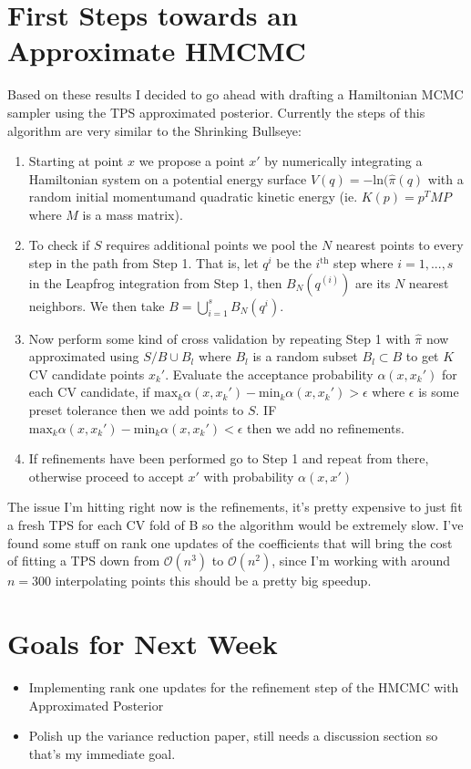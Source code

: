\documentclass[12pt,a4paper]{article}
\begin{document}
\section{First Steps towards an Approximate HMCMC}
Based on these results I decided to go ahead with drafting a Hamiltonian MCMC sampler using the TPS approximated posterior.  Currently the steps of this algorithm are very similar to the Shrinking Bullseye:
\begin{enumerate}
\item Starting at point $x$ we propose a point $x'$ by numerically integrating a Hamiltonian system on a potential energy surface $V(q) = -\text{ln}(\hat{\pi}(q)$ with a random initial momentumand quadratic kinetic energy (ie. $K(p) = p^T M P$ where $M$ is a mass matrix).
\item To check if $S$ requires additional points we pool the $N$ nearest points to every step in the path from Step 1.  That is, let $q^{i}$ be the $i^{\text{th}}$ step where $i = 1,...,s$ in the Leapfrog integration from Step 1, then $B_N(q^{(i)})$ are its $N$ nearest neighbors.  We then take $B = \bigcup\limits_{i=1}^{s}B_N(q^{i})$.
\item Now perform some kind of cross validation by repeating Step 1 with $\hat{\pi}$ now approximated using $S/B \cup B_l$ where $B_l$ is a random subset $B_l \subset B$ to get $K$ CV candidate points $x_k'$.  Evaluate the acceptance probability $\alpha(x,x_k')$ for each CV candidate, if $\text{max}_k \alpha(x, x_k') - \text{min}_k \alpha(x, x_k') > \epsilon$ where $\epsilon$ is some preset tolerance then we add points to $S$.  IF $\text{max}_k \alpha(x, x_k') - \text{min}_k \alpha(x, x_k') < \epsilon$ then we add no refinements.
\item  If refinements have been performed go to Step 1 and repeat from there, otherwise proceed to accept $x'$ with probability $\alpha(x,x')$
\end{enumerate}
The issue I'm hitting right now is the refinements, it's pretty expensive to just fit a fresh TPS for each CV fold of B so the algorithm would be extremely slow.  I've found some stuff on rank one updates of the coefficients that will bring the cost of fitting a TPS down from $\mathcal{O}(n^3)$ to $\mathcal{O}(n^2)$, since I'm working with around $n = 300$ interpolating points this should be a pretty big speedup.

\section{Goals for Next Week}
\begin{itemize}
\item Implementing rank one updates for the refinement step of the HMCMC with Approximated Posterior
\item Polish up the variance reduction paper, still needs a discussion section so that's my immediate goal.
\end{itemize}
\end{document}
